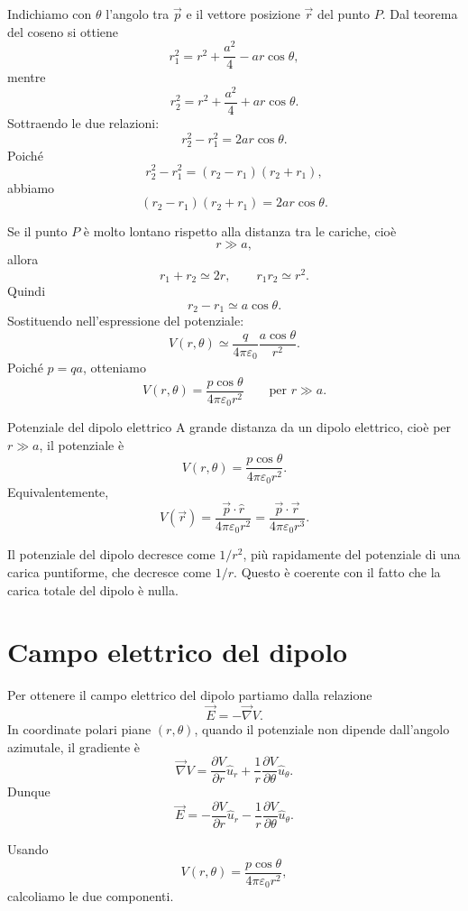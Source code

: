 \documentclass[a4paper]{article}
\begin{document}
Indichiamo con \(\theta\) l'angolo tra \(\vec{p}\) e il vettore posizione \(\vec{r}\) del punto \(P\). Dal teorema del coseno si ottiene
\[
    r_1^2=r^2+\frac{a^2}{4}-ar\cos\theta,
\]
mentre
\[
    r_2^2=r^2+\frac{a^2}{4}+ar\cos\theta.
\]
Sottraendo le due relazioni:
\[
    r_2^2-r_1^2=2ar\cos\theta.
\]
Poiché
\[
    r_2^2-r_1^2=(r_2-r_1)(r_2+r_1),
\]
abbiamo
\[
    (r_2-r_1)(r_2+r_1)=2ar\cos\theta.
\]

Se il punto \(P\) è molto lontano rispetto alla distanza tra le cariche, cioè
\[
    r\gg a,
\]
allora
\[
    r_1+r_2\simeq 2r,
    \qquad
    r_1r_2\simeq r^2.
\]
Quindi
\[
    r_2-r_1\simeq a\cos\theta.
\]
Sostituendo nell'espressione del potenziale:
\[
    V(r,\theta)\simeq \frac{q}{4\pi\varepsilon_0}\frac{a\cos\theta}{r^2}.
\]
Poiché \(p=qa\), otteniamo
\[
    V(r,\theta)=\frac{p\cos\theta}{4\pi\varepsilon_0r^2}
    \qquad\text{per } r\gg a.
\]

\begin{snippettheorem}{Potenziale del dipolo elettrico}
    A grande distanza da un dipolo elettrico, cioè per \(r\gg a\), il potenziale è
    \[
        V(r,\theta)=\frac{p\cos\theta}{4\pi\varepsilon_0r^2}.
    \]
    Equivalentemente,
    \[
        V(\vec{r})=\frac{\vec{p}\cdot\hat{r}}{4\pi\varepsilon_0r^2}
        =\frac{\vec{p}\cdot\vec{r}}{4\pi\varepsilon_0r^3}.
    \]
\end{snippettheorem}

Il potenziale del dipolo decresce come \(1/r^2\), più rapidamente del potenziale di una carica puntiforme, che decresce come \(1/r\). Questo è coerente con il fatto che la carica totale del dipolo è nulla.

\section{Campo elettrico del dipolo}

Per ottenere il campo elettrico del dipolo partiamo dalla relazione
\[
    \vec{E}=-\vec{\nabla}V.
\]
In coordinate polari piane \((r,\theta)\), quando il potenziale non dipende dall'angolo azimutale, il gradiente è
\[
    \vec{\nabla}V=\frac{\partial V}{\partial r}\hat{u}_r+\frac{1}{r}\frac{\partial V}{\partial\theta}\hat{u}_\theta.
\]
Dunque
\[
    \vec{E}=-\frac{\partial V}{\partial r}\hat{u}_r-\frac{1}{r}\frac{\partial V}{\partial\theta}\hat{u}_\theta.
\]

Usando
\[
    V(r,\theta)=\frac{p\cos\theta}{4\pi\varepsilon_0r^2},
\]
calcoliamo le due componenti.
\end{document}
